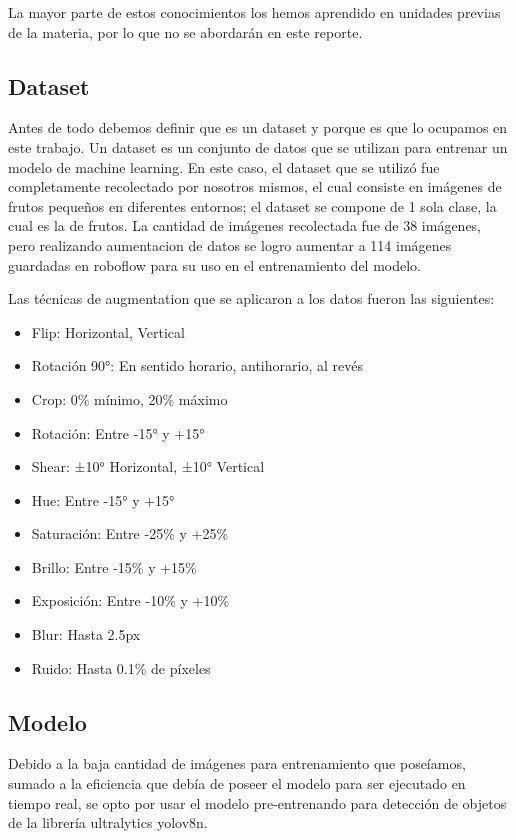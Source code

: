 \documentclass[conference]{IEEEtran}
\begin{document}
La mayor parte de estos conocimientos los hemos aprendido en unidades previas de la materia, por lo que no se abordarán en este reporte.

\subsection{Dataset}
Antes de todo debemos definir que es un dataset y porque es que lo ocupamos en este trabajo.
Un dataset es un conjunto de datos que se utilizan para entrenar un modelo de machine learning. En este caso, el dataset que se utilizó fue completamente recolectado por nosotros mismos\cite{}, el cual consiste en imágenes de frutos pequeños en diferentes entornos; el dataset se compone de 1 sola clase, la cual es la de frutos. La cantidad de imágenes recolectada fue de 38 imágenes, pero realizando aumentacion de datos se logro aumentar a 114 imágenes guardadas en roboflow\cite{} para su uso en el entrenamiento del modelo.

Las técnicas de augmentation que se aplicaron a los datos fueron las siguientes:
\begin{itemize}
    \item Flip: Horizontal, Vertical
    \item Rotación 90°: En sentido horario, antihorario, al revés
    \item Crop: 0\% mínimo, 20\% máximo
    \item Rotación: Entre -15° y +15°
    \item Shear: ±10° Horizontal, ±10° Vertical
    \item Hue: Entre -15° y +15°
    \item Saturación: Entre -25\% y +25\%
    \item Brillo: Entre -15\% y +15\%
    \item Exposición: Entre -10\% y +10\%
    \item Blur: Hasta 2.5px
    \item Ruido: Hasta 0.1\% de píxeles
\end{itemize}

\subsection{Modelo}
Debido a la baja cantidad de imágenes para entrenamiento que poseíamos, sumado a la eficiencia que debía de poseer el modelo para ser ejecutado en tiempo real, se opto por usar el modelo pre-entrenando para detección de objetos de la librería ultralytics\cite{} yolov8n\cite{}.
\end{document}
